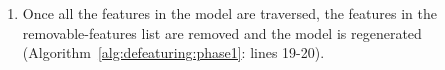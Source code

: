 \begin{enumerate}
\item Once all the features in the model are traversed, the features in the removable-features list are removed and the model is regenerated (Algorithm~\ref{alg:defeaturing:phase1}: lines 19-20).
\end{enumerate}






